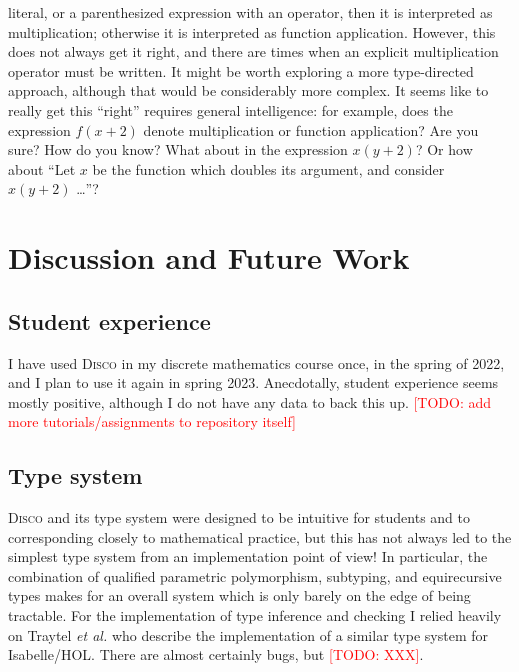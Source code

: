 \documentclass[submission,copyright,creativecommons]{eptcs}
\newcommand{\disco}{\textsc{Disco}\xspace}
\newcommand{\etal}{\emph{et al.}\xspace}
\newcommand{\todo}[1]{\textcolor{red}{[TODO: #1]}}
\newcommand{\todo}[1]{}
\begin{document}
\begin{itemize}
  literal, or a parenthesized expression with an operator, then it is
  interpreted as multiplication; otherwise it is interpreted as
  function application.  However, this does not always get it right,
  and there are times when an explicit multiplication operator must be
  written.  It might be worth exploring a more type-directed approach,
  although that would be considerably more complex.  It seems like to
  really get this ``right'' requires general intelligence: for
  example, does the expression $f(x+2)$ denote multiplication or
  function application?  Are you sure?  How do you know?  What about
  in the expression $x(y+2)$?  Or how about ``Let $x$ be the function
  which doubles its argument, and consider $x(y+2)$ \dots''?
\end{itemize}

\section{Discussion and Future Work}
\label{sec:discussion}

\subsection{Student experience}
\label{sec:students}

I have used \disco in my discrete mathematics course once, in the
spring of 2022, and I plan to use it again in spring 2023.  Anecdotally,
student experience seems mostly positive, although I do not
have any data to back this up. \todo{add more tutorials/assignments to
repository itself}

\subsection{Type system}
\label{sec:types}

\disco and its type system were designed to be intuitive for students
and to corresponding closely to mathematical practice, but this has
not always led to the simplest type system from an implementation
point of view!  In particular, the combination of qualified parametric
polymorphism, subtyping, and equirecursive types makes for an overall
system which is only barely on the edge of being tractable.
For the implementation of type inference and checking I relied heavily
on Traytel \etal \cite{traytel2011extending} who describe the
implementation of a similar type system for Isabelle/HOL.  There are
almost certainly bugs, but \todo{XXX}.
\end{document}
